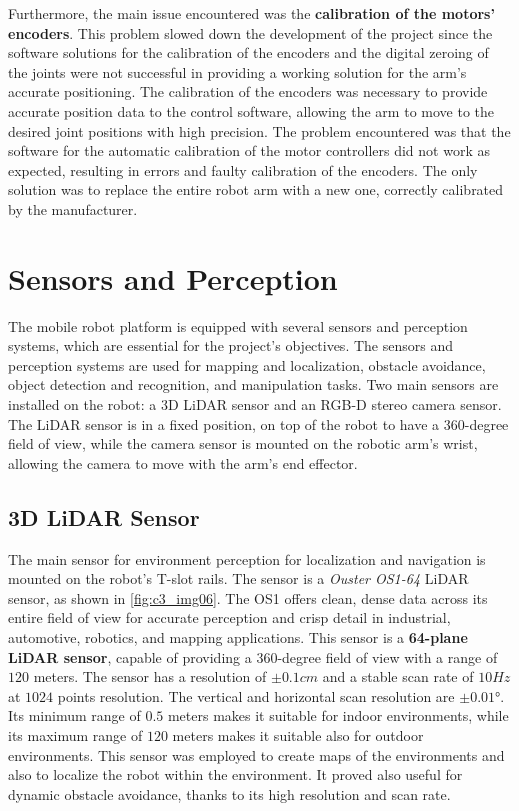 Furthermore, the main issue encountered was the \textbf{calibration of the motors' encoders}.
This problem slowed down the development
of the project since the software solutions for the calibration of the encoders and the digital zeroing of the joints were not
successful in providing a working solution for the arm's accurate positioning. The calibration of the encoders was necessary
to provide accurate position data to the control software, allowing the arm to move to the desired joint positions with high
precision. The problem encountered was that the software for the automatic calibration of the motor controllers did not work
as expected, resulting in errors and faulty calibration of the encoders. The only solution was to replace the entire robot
arm with a new one, correctly calibrated by the manufacturer.

\section{Sensors and Perception}

The mobile robot platform is equipped with several sensors and perception systems, which are essential for the project's
objectives. The sensors and perception systems are used for mapping and localization, obstacle avoidance, object detection
and recognition, and manipulation tasks. 
Two main sensors are installed on the robot: a 3D LiDAR sensor and an RGB-D stereo camera sensor.
The LiDAR sensor is in a fixed position, on top of the robot to have a 360-degree field of view, while the camera sensor
is mounted on the robotic arm's wrist, allowing the camera to move with the arm's end effector.

\subsection{3D LiDAR Sensor}

The main sensor for environment perception for localization and navigation is mounted on the robot's T-slot rails.
The sensor is a \textit{Ouster OS1-64} LiDAR sensor, as shown in \ref{fig:c3_img06}.
The OS1 offers clean, dense data across its entire field of view for accurate perception and crisp detail in industrial,
automotive, robotics, and mapping applications.
This sensor is a \textbf{64-plane LiDAR sensor}, capable of providing a 360-degree field of view with a range of $120$ meters. 
The sensor has a resolution of $\pm 0.1cm$ and a stable scan rate of $10 Hz$ at $1024$ points resolution.
The vertical and horizontal scan resolution are $\pm 0.01$°.
Its minimum range of $0.5$ meters makes it suitable for indoor environments, while its maximum range of $120$ meters
makes it suitable also for outdoor environments.
This sensor was employed to create maps of the environments and also to localize the robot within the environment.
It proved also useful for dynamic obstacle avoidance, thanks to its high resolution and scan rate.

